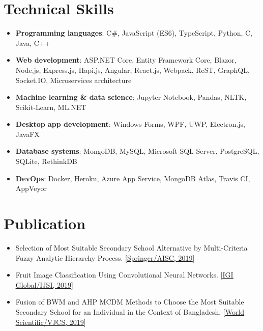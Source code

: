 \documentclass[letter-paper,10pt]{article}
\newcommand{\resumeItem}[2]{
  \item\small{
    \textbf{#1}{: #2 \vspace{-2pt}}
  }
}
\newcommand{\resumeSubItem}[2]{\resumeItem{#1}{#2}\vspace{-3pt}}
\newcommand{\pubItem}[1]{
  \item\small{
    {#1 \vspace{-2pt}}\vspace{-3pt}
  }
}
\newcommand{\resumeSubHeadingListStart}{\begin{itemize}[leftmargin=*]}
\newcommand{\resumeSubHeadingListEnd}{\end{itemize}}
\begin{document}
\section{Technical Skills}
  \resumeSubHeadingListStart
    \resumeSubItem{Programming languages}
      {C\#, JavaScript (ES6), TypeScript, Python, C, Java, C++}
    \resumeSubItem{Web development}
      {ASP.NET Core, Entity Framework Core, Blazor, Node.js, Express.js, Hapi.js, Angular, React.js, Webpack, ReST, GraphQL, Socket.IO, Microservices architecture}
    \resumeSubItem{Machine learning \& data science}
      {Jupyter Notebook, Pandas, NLTK, Scikit-Learn, ML.NET}
    \resumeSubItem{Desktop app development}
      {Windows Forms, WPF, UWP, Electron.js, JavaFX}
    \resumeSubItem{Database systems}
      {MongoDB, MySQL, Microsoft SQL Server, PostgreSQL, SQLite, RethinkDB}
    \resumeSubItem{DevOps}
      {Docker, Heroku, Azure App Service, MongoDB Atlas, Travis CI, AppVeyor}
  \resumeSubHeadingListEnd
  
\section{Publication}
  \resumeSubHeadingListStart
    \pubItem
      {Selection of Most Suitable Secondary School Alternative by Multi-Criteria Fuzzy Analytic Hierarchy Process. [\href{https://link.springer.com/chapter/10.1007\%2F978-3-319-98678-4_29}{\underline{Springer/AISC, 2019}}]}
    \pubItem
      {Fruit Image Classification Using Convolutional Neural Networks. [\href{https://www.igi-global.com/gateway/article/236206}{\underline{IGI Global/IJSI, 2019}}]}
    \pubItem
      {Fusion of BWM and AHP MCDM Methods to Choose the Most Suitable Secondary School for an Individual in the Context of Bangladesh. [\href{https://www.worldscientific.com/doi/abs/10.1142/S2196888819500167}{\underline{World Scientific/VJCS, 2019}}]}
  \resumeSubHeadingListEnd

\end{document}
